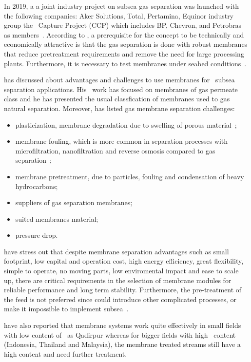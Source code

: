 In 2019, a a joint industry project on subsea gas separation was launched with the following companies: Aker Solutions, Total, Pertamina, Equinor industry group the \CO~Capture Project (CCP) which includes BP, Chevron, and Petrobras as members~\citep{Berge2019}. According to \citet{Berge2019}, a prerequisite for the concept to be technically and economically attractive is that the gas separation is done with robust membranes that reduce pretreatment requirements and remove the need for large processing plants. Furthermore, it is necessary to test membranes under seabed conditions~\citep{Berge2019}.

\citet{Ommedal2021} has discussed about advantages and challenges to use membranes for \CO~subsea separation applications. His~\citep{Ommedal2021} work has focused on membranes of gas permeate class and he has presented the usual classfication of membranes used to gas natural separation. Moreover, \citet{Ommedal2021} has listed gas membrane separation challenges:
\begin{itemize}
 \item plasticization, membrane degradation due to swelling of porous material~\citep{Ommedal2021};
 \item membrane fouling, which is more common in separation processes with microfiltration, nanofiltration and reverse osmosis compared to gas separation~\citep{Ommedal2021};
 \item membrane pretreatment, due to particles, fouling and condensation of heavy hydrocarbons;
 \item suppliers of gas separation membranes;
 \item suited membranes material;
 \item pressure drop. 
\end{itemize}

\citet{Dalane2017} have stress out that despite membrane separation advantages such as small footprint, low capital and operation cost, high energy efficiency, great flexibility, simple to operate, no moving parts, low enviromental impact and ease to scale up, there are critical requirements in the selection of membrane modules for reliable performance and long term stability. Furthermore, the pre-treatment of the feed is not preferred since could introduce other complicated processes, or make it impossible to implement subsea~\citep{Dalane2017}.

\citet{Dalane2017} have also reported that membrane systems work quite effectively in small fields with low content of \CO~as Qadirpur whereas for bigger fields with high \CO~content (Indonesia, Thailand and Malaysia), the membrane treated streams still have a high \CO content and need further treatment.

